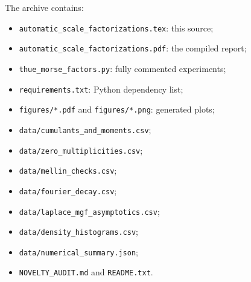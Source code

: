 \documentclass[11pt,oneside]{article}
\numberwithin{equation}{section}
\theoremstyle{definition}
\theoremstyle{remark}
\begin{document}
The archive contains:
\begin{itemize}
\item \texttt{automatic\_scale\_factorizations.tex}: this source;
\item \texttt{automatic\_scale\_factorizations.pdf}: the compiled report;
\item \texttt{thue\_morse\_factors.py}: fully commented experiments;
\item \texttt{requirements.txt}: Python dependency list;
\item \texttt{figures/*.pdf} and \texttt{figures/*.png}: generated plots;
\item \texttt{data/cumulants\_and\_moments.csv};
\item \texttt{data/zero\_multiplicities.csv};
\item \texttt{data/mellin\_checks.csv};
\item \texttt{data/fourier\_decay.csv};
\item \texttt{data/laplace\_mgf\_asymptotics.csv};
\item \texttt{data/density\_histograms.csv};
\item \texttt{data/numerical\_summary.json};
\item \texttt{NOVELTY\_AUDIT.md} and \texttt{README.txt}.
\end{itemize}
\end{document}
